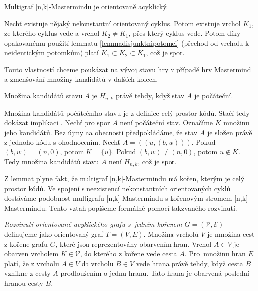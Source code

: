 \begin{lemma}
    Multigraf [n,k]-Mastermindu je orientovaně acyklický. 
\end{lemma}
\begin{dukaz}
    Nechť existuje nějaký nekonstantní orientovaný cyklus. Potom existuje vrchol $K_1$, ze kterého cyklus vede a vrchol $K_2 \neq K_1$, přes který cyklus vede. Potom díky opakovanému použití lemmatu \ref{lemmadisjunktnipotomci} (přechod od vrcholu k neidentickým potomkům) platí $K_1 \subset K_2 \subset K_1$, což je spor. 
\end{dukaz}
Touto vlastností chceme poukázat na vývoj stavu hry v případě hry Mastermind a zmenšování množiny kandidátů v dalších kolech. 

\begin{lemma}\label{lemmakandidatipocstavu}
    Množina kandidátů stavu $A$ je $H_{n,k}$ právě tehdy, když stav $A$ je počáteční.
\end{lemma}
\begin{dukaz}
    Množina kandidátů počátečního stavu je z definice celý prostor kódů. Stačí tedy dokázat implikaci \uv{\Rightarrow}. Nechť pro spor $A$ není počáteční stav. Označíme $K$ množinu jeho kandidátů. Bez újmy na obecnosti předpokládáme, že stav $A$ je složen právě z jednoho kódu s ohodnocením. Nechť $A = ((u, (b,w)))$. Pokud $(b,w) = (n,0)$, potom $K = \{u\}$. Pokud $(b,w) \neq (n,0)$, potom $u \notin K$. Tedy množina kandidátů stavu $A$ není $H_{n,k}$, což je spor. 
\end{dukaz}

Z lemmat plyne fakt, že multigraf [n,k]-Mastermindu má kořen, kterým je celý prostor kódů. Ve spojení s neexistencí nekonstantních orientovaných cyklů dostáváme podobnost multigrafu [n,k]-Mastermindu s kořenovým stromem [n,k]-Mastermindu. Tento vztah popíšeme formálně pomocí takzvaného rozvinutí.
\begin{definice}
    \emph{Rozvinutí orientovaně acyklického grafu s~jedním kořenem $G = (\mathcal{V}, \mathcal{E})$} definujeme jako orientovaný graf $T = (V, E)$.
    Množina vrcholů $V$ je množina cest z kořene grafu $G$, které jsou reprezentovány obarvením hran. Vrchol $A \in V$ je obarven vrcholem $K \in \mathcal{V}$, do kterého z kořene vede cesta $A$. 
    Pro~množinu hran $E$ platí, že z vrcholu $A \in V$ do vrcholu $B \in V$ vede hrana právě tehdy, když cesta $B$ vznikne z cesty $A$ prodloužením o jednu hranu. Tato hrana je obarvená poslední hranou cesty $B$. 
\end{definice}


